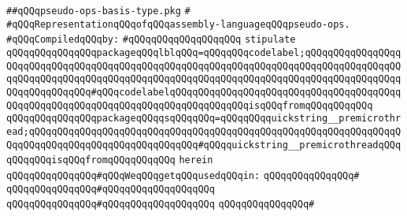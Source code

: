\label{src/lib/compiler/back/low/mcg/pseudo-op-basis-type.pkg}
\verb|##qQQqpseudo-ops-basis-type.pkg|\newline
\verb|#|\newline
\verb|#qQQqRepresentationqQQqofqQQqassembly-languageqQQqpseudo-ops.|\newline
\newline
\verb|#qQQqCompiledqQQqby:|\newline
\verb|#qQQqqQQqqQQqqQQqqQQq|\newline
\newline
\newline
\newline
\newline
\newline
\verb|stipulate|\newline
\verb|qQQqqQQqqQQqqQQqpackageqQQqlblqQQq=qQQqqQQqcodelabel;qQQqqQQqqQQqqQQqqQQqqQQqqQQqqQQqqQQqqQQqqQQqqQQqqQQqqQQqqQQqqQQqqQQqqQQqqQQqqQQqqQQqqQQqqQQqqQQqqQQqqQQqqQQqqQQqqQQqqQQqqQQqqQQqqQQqqQQqqQQqqQQqqQQqqQQqqQQqqQQqqQQqqQQqqQQq#qQQqcodelabelqQQqqQQqqQQqqQQqqQQqqQQqqQQqqQQqqQQqqQQqqQQqqQQqqQQqqQQqqQQqqQQqqQQqqQQqqQQqqQQqqQQqisqQQqfromqQQqqQQqqQQq|\newline
\verb|qQQqqQQqqQQqqQQqpackageqQQqqsqQQqqQQq=qQQqqQQqquickstring__premicrothread;qQQqqQQqqQQqqQQqqQQqqQQqqQQqqQQqqQQqqQQqqQQqqQQqqQQqqQQqqQQqqQQqqQQqqQQqqQQqqQQqqQQqqQQqqQQqqQQqqQQq#qQQqquickstring__premicrothreadqQQqqQQqqQQqisqQQqfromqQQqqQQqqQQq|\newline
\verb|herein|\newline
\newline
\verb|qQQqqQQqqQQqqQQq#qQQqWeqQQqgetqQQqusedqQQqin:|\newline
\verb|qQQqqQQqqQQqqQQq#|\newline
\verb|qQQqqQQqqQQqqQQq#qQQqqQQqqQQqqQQqqQQq|\newline
\verb|qQQqqQQqqQQqqQQq#qQQqqQQqqQQqqQQqqQQq|\newline
\verb|qQQqqQQqqQQqqQQq#|\newline
